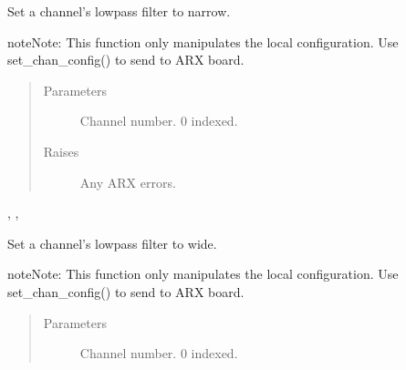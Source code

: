 \documentclass[letterpaper,10pt,english]{sphinxmanual}
\begin{document}
\begin{fulllineitems}
\begin{fulllineitems}
\label{\detokenize{index:lwautils.lwa_arx.ARX.set_chan_cfg_lowpass_narrow}}
Set a channel’s lowpass filter to narrow.

\begin{sphinxadmonition}{note}{Note:}
This function only manipulates the local configuration.
Use set\_chan\_config() to send to ARX board.
\end{sphinxadmonition}
\begin{quote}\begin{description}
\item[{Parameters}] \leavevmode
{} \textendash{} Channel number. 0 indexed.

\item[{Raises}] \leavevmode
{} \textendash{} Any ARX errors.

\end{description}\end{quote}




{\hyperref[\detokenize{index:lwautils.lwa_arx.ARX.show_chan_cfg}]{}}, {\hyperref[\detokenize{index:lwautils.lwa_arx.ARX.set_chan_cfg}]{}}, {\hyperref[\detokenize{index:lwautils.lwa_arx.ARX.set_chan_cfg_lowpass_wide}]{}}



\end{fulllineitems}


\begin{fulllineitems}
\label{\detokenize{index:lwautils.lwa_arx.ARX.set_chan_cfg_lowpass_wide}}
Set a channel’s lowpass filter to wide.

\begin{sphinxadmonition}{note}{Note:}
This function only manipulates the local configuration.
Use set\_chan\_config() to send to ARX board.
\end{sphinxadmonition}
\begin{quote}\begin{description}
\item[{Parameters}] \leavevmode
{} \textendash{} Channel number. 0 indexed.


\end{description}
\end{quote}
\end{fulllineitems}
\end{fulllineitems}
\end{document}
